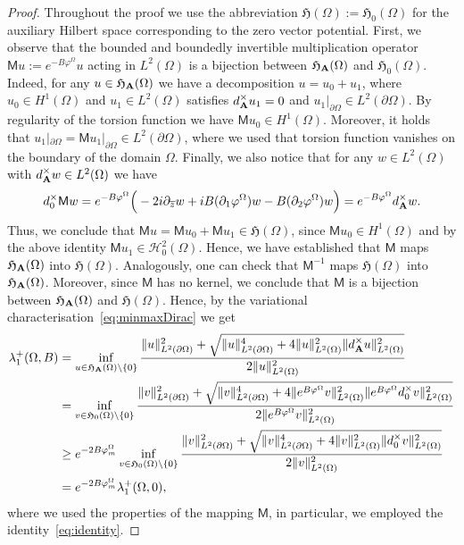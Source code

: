 \documentclass[10pt,a4paper]{amsart}
\def\lm{\lambda}
\def\p{\partial}
\def\sH{{\mathfrak H}}   \def\sI{{\mathfrak I}}
\def\sfM{{\mathsf M}}   \def\sfN{{\mathsf N}}   \def\sfO{{\mathsf O}}
\newcommand\Omg{\Omega}
\newcommand\ov{\overline}
\newcommand\sm{\setminus}
\begin{document}
\begin{proof}
	Throughout the proof we use the abbreviation $\sH(\Omg) := \sH_0(\Omg)$ for the auxiliary Hilbert space corresponding to the zero vector potential.	First, we observe that the
	bounded and boundedly invertible multiplication operator 
	$\sfM u := e^{-B\varphi^\Omg} u$ acting in $L^2(\Omg)$ is a bijection between $\sH_{\bf A}(\Omg)$ and $\sH_0(\Omg)$. Indeed, for any $u\in\sH_{\bf A}(\Omg)$ we have a decomposition $u = u_0 + u_1$, where $u_0\in H^1(\Omg)$ and $u_1\in L^2(\Omg)$ satisfies $d_{\bf A}^\times u_1 = 0$ and $u_1|_{\p\Omg}\in L^2(\p\Omg)$. By regularity of the torsion function we have $\sfM u_0 \in H^1(\Omg)$.
	Moreover, it holds that $u_1|_{\p\Omg} = \sfM u_1|_{\p\Omg}\in L^2(\p\Omg)$, where we used that torsion function vanishes on the boundary of the domain $\Omg$. Finally, we also notice
	that for any $w\in L^2(\Omg)$ with $d_{\bf A}^\times w\in L^2(\Omg)$ we have
	\begin{equation}\label{eq:identity}
		d_0^\times \sfM w = e^{-B\varphi^\Omg}\Big(-2i \p_{\ov z} w + i B(\p_1\varphi^\Omg) w  - B(\p_2\varphi^\Omg) w\Big) = e^{-B\varphi^\Omg} d_{\bf A}^\times w. 
	\end{equation}
	Thus, we conclude that $\sfM u =\sfM u_0 + \sfM u_1\in\sH(\Omg)$, since $\sfM u_0\in H^1(\Omg)$ and
	by the above identity $\sfM u_1\in\mathscr{H}_{0}^2(\Omg)$. Hence, we have established that $\sfM$ maps $\sH_{{\bf A}}(\Omg)$ into $\sH(\Omg)$. Analogously, one can check that $\sfM^{-1}$ maps $\sH(\Omg)$ into $\sH_{{\bf A}}(\Omg)$. Moreover, since $\sfM$ has no kernel, we conclude that $\sfM$ is a bijection between $\sH_{\bf A}(\Omg)$ and $\sH(\Omg)$.
	Hence, by the variational characterisation~\eqref{eq:minmaxDirac} we get
	\[
	\begin{aligned}
		\lm_1^+(\Omg,B) &= \inf_{u\in \sH_{{\bf A}}(\Omg)\sm\{0\}}
		\frac{\|u\|^2_{L^2(\p\Omg)} + \sqrt{\|u\|^4_{L^2(\p\Omg)}+ 4\|u\|^2_{L^2(\Omg)} \|d_{\bf A}^\times u\|^2_{L^2(\Omg)}}}{2\|u\|^2_{L^2(\Omg)}}\\
		&=\inf_{v\in \sH_0(\Omg)\sm\{0\}}
		\frac{\|v\|^2_{L^2(\p\Omg)} + \sqrt{\|v\|^4_{L^2(\p\Omg)}+ 4\|e^{B\varphi^\Omg}v\|^2_{L^2(\Omg)} \|e^{B\varphi^\Omg}d_0^\times v\|^2_{L^2(\Omg)}}}{2\|e^{B\varphi^\Omg} v\|^2_{L^2(\Omg)}}\\
		&\ge e^{-2B\varphi^\Omg_{\rm m}}\inf_{v\in \sH_0(\Omg)\sm\{0\}}
				\frac{\|v\|^2_{L^2(\p\Omg)} + \sqrt{\|v\|^4_{L^2(\p\Omg)}+ 4\|v\|^2_{L^2(\Omg)} \|d_0^\times v\|^2_{L^2(\Omg)}}}{2\|v\|^2_{L^2(\Omg)}}\\
				& = e^{-2B\varphi^\Omg_{\rm m}}\lm_1^+(\Omg,0),
		\end{aligned}
	\]
	where we used the properties of the mapping $\sfM$, in particular, we employed the identity~\eqref{eq:identity}.
\end{proof}
\end{document}
